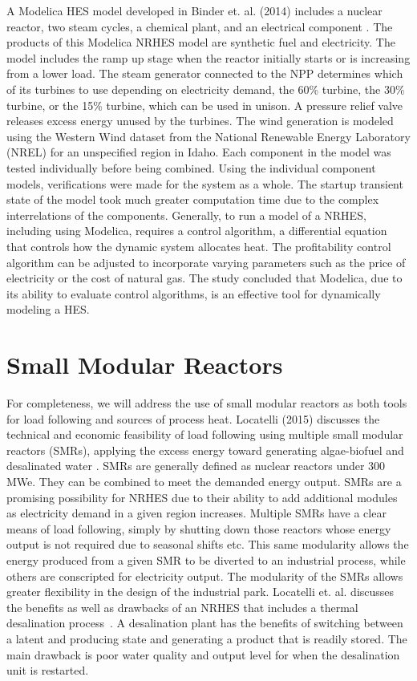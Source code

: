 \documentclass[12pt]{UIdahoMastersThesis}
\begin{document}
A Modelica HES model developed in Binder et. al. (2014) includes a nuclear reactor, two steam cycles, a chemical plant, and an electrical component \cite{Binder2014}. The products of this Modelica NRHES model are synthetic fuel and electricity. The model includes the ramp up stage when the reactor initially starts or is increasing from a lower load. The steam generator connected to the NPP determines which of its turbines to use depending on electricity demand, the 60\% turbine, the 30\% turbine, or the 15\% turbine, which can be used in unison. A pressure relief valve releases excess energy unused by the turbines. The wind generation is modeled using the Western Wind dataset from the National Renewable Energy Laboratory (NREL) for an unspecified region in Idaho. Each component in the model was tested individually before being combined. Using the individual component models, verifications were made for the system as a whole. The startup transient state of the model took much greater computation time due to the complex interrelations of the components. Generally, to run a model of a NRHES, including using Modelica, requires a control algorithm, a differential equation that controls how the dynamic system allocates heat. The profitability control algorithm can be adjusted to incorporate varying parameters such as the price of electricity or the cost of natural gas. The study concluded that Modelica, due to its ability to evaluate control algorithms, is an effective tool for dynamically modeling a HES.

\section{Small Modular Reactors}
For completeness, we will address the use of small modular reactors as both tools for load following and sources of process heat. Locatelli (2015) discusses the technical and economic feasibility of load following using multiple small modular reactors (SMRs), applying the excess energy toward generating algae-biofuel and desalinated water \cite{Locatelli2015}. SMRs are generally defined as nuclear reactors under 300 MWe. They can be combined to meet the demanded energy output. SMRs are a promising possibility for NRHES due to their ability to add additional modules as electricity demand in a given region increases. Multiple SMRs have a clear means of load following, simply by shutting down those reactors whose energy output is not required due to seasonal shifts etc. This same modularity allows the energy produced from a given SMR to be diverted to an industrial process, while others are conscripted for electricity output. The modularity of the SMRs allows greater flexibility in the design of the industrial park.  Locatelli et. al. discusses the benefits as well as drawbacks of an NRHES that includes a thermal desalination process~\cite {Locatelli2015}. A desalination plant has the benefits of switching between a latent and producing state and generating a product that is readily stored. The main drawback is poor water quality and output level for when the desalination unit is restarted.
\end{document}
